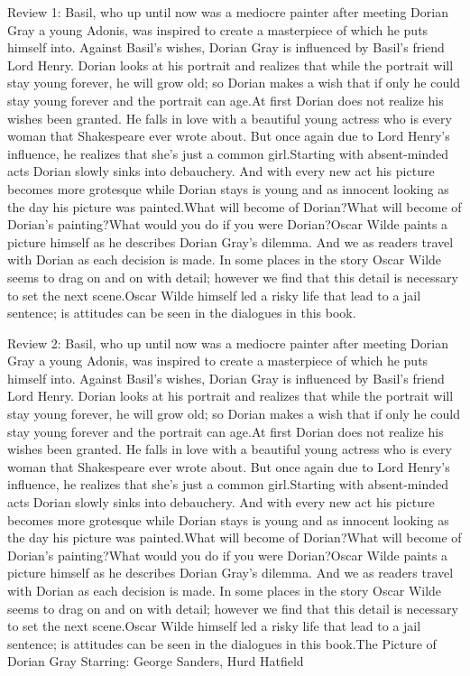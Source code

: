 \documentclass[12pt, a4paper[]{article}
\begin{document}
\begin{itemize}
    {\fontsize{9pt}{11pt}\selectfont
    \item Review 1: Basil, who up until now was a mediocre painter after meeting Dorian Gray a young Adonis, was inspired to create a masterpiece of which he puts himself into. Against Basil's wishes, Dorian Gray is influenced by Basil's friend Lord Henry. Dorian looks at his portrait and realizes that while the portrait will stay young forever, he will grow old; so Dorian makes a wish that if only he could stay young forever and the portrait can age.At first Dorian does not realize his wishes been granted. He falls in love with a beautiful young actress who is every woman that Shakespeare ever wrote about. But once again due to Lord Henry's influence, he realizes that she's just a common girl.Starting with absent-minded acts Dorian slowly sinks into debauchery. And with every new act his picture becomes more grotesque while Dorian stays is young and as innocent looking as the day his picture was painted.What will become of Dorian?What will become of Dorian's painting?What would you do if you were Dorian?Oscar Wilde paints a picture himself as he describes Dorian Gray's dilemma. And we as readers travel with Dorian as each decision is made. In some places in the story Oscar Wilde seems to drag on and on with detail; however we find that this detail is necessary to set the next scene.Oscar Wilde himself led a risky life that lead to a jail sentence; is attitudes can be seen in the dialogues in this book.
    \item Review 2: Basil, who up until now was a mediocre painter after meeting Dorian Gray a young Adonis, was inspired to create a masterpiece of which he puts himself into. Against Basil's wishes, Dorian Gray is influenced by Basil's friend Lord Henry. Dorian looks at his portrait and realizes that while the portrait will stay young forever, he will grow old; so Dorian makes a wish that if only he could stay young forever and the portrait can age.At first Dorian does not realize his wishes been granted. He falls in love with a beautiful young actress who is every woman that Shakespeare ever wrote about. But once again due to Lord Henry's influence, he realizes that she's just a common girl.Starting with absent-minded acts Dorian slowly sinks into debauchery. And with every new act his picture becomes more grotesque while Dorian stays is young and as innocent looking as the day his picture was painted.What will become of Dorian?What will become of Dorian's painting?What would you do if you were Dorian?Oscar Wilde paints a picture himself as he describes Dorian Gray's dilemma. And we as readers travel with Dorian as each decision is made. In some places in the story Oscar Wilde seems to drag on and on with detail; however we find that this detail is necessary to set the next scene.Oscar Wilde himself led a risky life that lead to a jail sentence; is attitudes can be seen in the dialogues in this book.The Picture of Dorian Gray Starring: George Sanders, Hurd Hatfield
}
\end{itemize}
\end{document}
